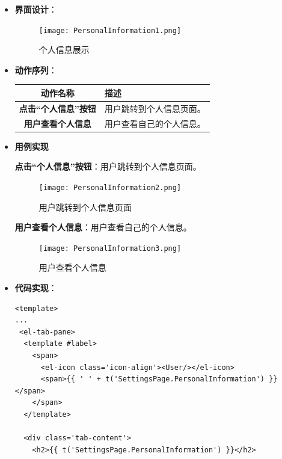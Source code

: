 \begin{itemize}
\item \textbf{界面设计}：
	\begin{figure}[H]
		\centering
		\texttt{[image: PersonalInformation1.png]}
		\caption{个人信息展示}
	\end{figure}
	\item \textbf{动作序列}：
	\begin{table}[H]
		\centering
		\renewcommand\arraystretch{1.5}
		\begin{tabular}{|c|>{\raggedright\arraybackslash}p{10cm}|}
			\hline
			\textbf{动作名称} & \textbf{描述} \\ \hline
			\textbf{点击“个人信息”按钮} & 用户跳转到个人信息页面。\\ \hline
			\textbf{用户查看个人信息} & 用户查看自己的个人信息。\\ \hline
		\end{tabular}
	\end{table}

	\item \textbf{用例实现}

	\textbf{点击“个人信息”按钮}：用户跳转到个人信息页面。

	\begin{figure}[H]
		\centering
		\texttt{[image: PersonalInformation2.png]}
		\caption{用户跳转到个人信息页面}
	\end{figure}

	\textbf{用户查看个人信息}：用户查看自己的个人信息。

	\begin{figure}[H]
		\centering
		\texttt{[image: PersonalInformation3.png]}
		\caption{用户查看个人信息}
	\end{figure}

	\item \textbf{代码实现}：
	\begin{verbatim}
<template>
...
 <el-tab-pane>
  <template #label>
    <span>
      <el-icon class='icon-align'><User/></el-icon>
      <span>{{ ' ' + t('SettingsPage.PersonalInformation') }}</span>
    </span>
  </template>
	
  <div class='tab-content'>
    <h2>{{ t('SettingsPage.PersonalInformation') }}</h2>
	

\end{verbatim}
\end{itemize}
